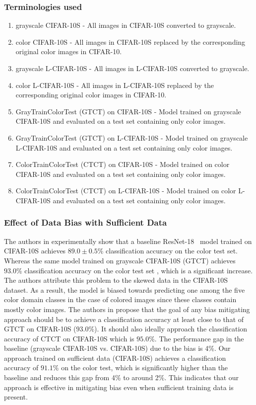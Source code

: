 \documentclass[10pt,twocolumn,letterpaper]{article}
\begin{document}
\subsubsection{Terminologies used}
\begin{enumerate}
    \item grayscale CIFAR-10S - All images in CIFAR-10S converted to grayscale.
    \item color CIFAR-10S - All images in CIFAR-10S replaced by the corresponding original color images in CIFAR-10.
    \item grayscale L-CIFAR-10S - All images in L-CIFAR-10S converted to grayscale.
    \item color L-CIFAR-10S - All images in L-CIFAR-10S replaced by the corresponding original color images in CIFAR-10.
    \item GrayTrainColorTest (GTCT) on CIFAR-10S - Model trained on grayscale CIFAR-10S and evaluated on a test set containing only color images.
    \item GrayTrainColorTest (GTCT) on L-CIFAR-10S - Model trained on grayscale L-CIFAR-10S and evaluated on a test set containing only color images.
    \item ColorTrainColorTest (CTCT) on CIFAR-10S - Model trained on color CIFAR-10S and evaluated on a test set containing only color images.
    \item ColorTrainColorTest (CTCT) on L-CIFAR-10S - Model trained on color L-CIFAR-10S and evaluated on a test set containing only color images.
\end{enumerate}



\subsubsection{Effect of Data Bias with Sufficient Data}\label{sec:sufdata}

The authors in \cite{wang2020towards} experimentally show that a baseline ResNet-18~\cite{he_deep_2015} model trained on CIFAR-10S achieves $89.0\pm 0.5\%$ classification accuracy on the color test set. Whereas the same model trained on grayscale CIFAR-10S (GTCT) achieves $93.0\%$ classification accuracy on the color test set \cite{wang2020towards}, which is a significant increase. The authors attribute this problem to the skewed data in the CIFAR-10S dataset. As a result, the model is biased towards predicting one among the five color domain classes in the case of colored images since these classes contain mostly color images. The authors in \cite{wang2020towards} propose that the goal of any bias mitigating approach should be to achieve a classification accuracy at least close to that of GTCT on CIFAR-10S ($93.0\%$). It should also ideally approach the classification accuracy of CTCT on CIFAR-10S which is $95.0\%$. The performance gap in the baseline (grayscale CIFAR-10S vs. CIFAR-10S) due to the bias is 4\%. Our approach trained on sufficient data (CIFAR-10S) achieves a classification accuracy of $91.1\%$ on the color test, which is significantly higher than the baseline and reduces this gap from 4\% to around 2\%. This indicates that our approach is effective in mitigating bias even when sufficient training data is present.
\end{document}
